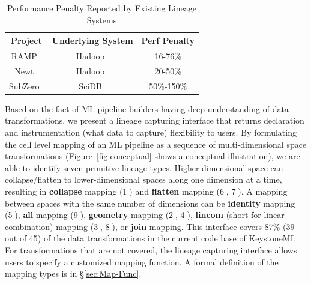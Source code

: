\documentclass{sig-alternate}
\begin{document}
\begin{table}[t]
\begin{center}
    \caption{Performance Penalty Reported by Existing Lineage Systems}
    \begin{scriptsize}
    \begin{tabular}{ | c | c | c |}
    \hline
    Project & Underlying System & Perf Penalty  \\ \hline \hline
    RAMP~\cite{ikeda11} & Hadoop~\cite{HADOOP} & 16-76\% \\ \hline
    Newt~\cite{logothetis13} & Hadoop~\cite{HADOOP} & 20-50\% \\ \hline
    SubZero~\cite{wu13} & SciDB~\cite{brown10} & 50\%-150\% \\ \hline
    \end{tabular}
    \end{scriptsize}
    \label{tb:overhead}
\end{center}   
\end{table}

Based on the fact of ML pipeline builders having deep understanding of data transformations,  
we present a lineage capturing interface that returns declaration and instrumentation (what data to capture) flexibility to users. 
By formulating the cell level mapping of an ML pipeline as a sequence of multi-dimensional space transformations
(Figure~\ref{fig:conceptual} shows a conceptual illustration), we are able to identify seven primitive lineage types.
Higher-dimensional space can collapse/flatten to lower-dimensional spaces along one dimension at a time, 
resulting in {\bf collapse} mapping (\textcircled{1}) and {\bf flatten} mapping (\textcircled{6}, \textcircled{7}). 
A mapping between spaces with the same number of dimensions can be {\bf identity} mapping (\textcircled{5}), {\bf all} mapping (\textcircled{9}), 
{\bf geometry} mapping (\textcircled{2}, \textcircled{4}), {\bf lincom} (short for linear combination) mapping (\textcircled{3}, \textcircled{8}),
or {\bf join} mapping. 
This interface covers 87\% (39 out of 45) of the data transformations in the current code base of KeystoneML. 
For transformations that are not covered, the lineage capturing interface allows users to specify a customized mapping function.
A formal definition of the mapping types is in \S\ref{sec:Map-Func}.
\end{document}
